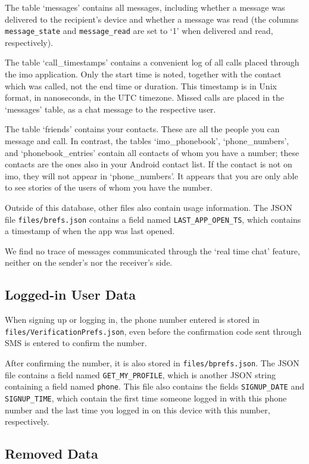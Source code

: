 \documentclass[conference]{IEEEtran}
\begin{document}
The table `messages' contains all messages, including whether a message was
delivered to the recipient's device and whether a message was read (the columns
\texttt{message\_state} and \texttt{message\_read} are set to `1' when
delivered and read, respectively).

The table `call\_timestamps' contains a convenient log of all calls placed
through the imo application. Only the start time is noted, together with the
contact which was called, not the end time or duration. This timestamp is in
Unix format, in nanoseconds, in the UTC timezone. Missed calls are placed in
the `messages' table, as a chat message to the respective user.

The table `friends' contains your contacts. These are all the people you can
message and call. In contrast, the tables `imo\_phonebook', `phone\_numbers',
and `phonebook\_entries' contain all contacts of whom you have a number; these
contacts are the ones also in your Android contact list. If the contact is not
on imo, they will not appear in `phone\_numbers'. It appears that you are only
able to see stories of the users of whom you have the number.

Outside of this database, other files also contain usage information. The JSON
file \texttt{files/brefs.json} contains a field named
\texttt{LAST\_APP\_OPEN\_TS}, which contains a timestamp of when the app was
last opened.

We find no trace of messages communicated through the `real time chat' feature,
neither on the sender's nor the receiver's side.


\subsection{Logged-in User Data}

When signing up or logging in, the phone number entered is stored in
\texttt{files/VerificationPrefs.json}, even before the confirmation code sent
through SMS is entered to confirm the number.

After confirming the number, it is also stored in \texttt{files/bprefs.json}.
The JSON file contains a field named \texttt{GET\_MY\_PROFILE}, which is
another JSON string containing a field named \texttt{phone}. This file also
contains the fields \texttt{SIGNUP\_DATE} and \texttt{SIGNUP\_TIME}, which
contain the first time someone logged in with this phone number and the last
time you logged in on this device with this number, respectively.


\subsection{Removed Data}
\end{document}
